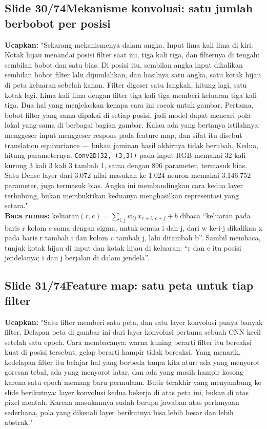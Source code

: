 \documentclass[11pt]{article}
\renewcommand{\framebox}[1]{\colorbox{acc!15}{\textcolor{acc}{\textbf{#1}}}}
\begin{document}
\subsection*{\framebox{Slide 30/74}\quad Mekanisme konvolusi: satu jumlah berbobot per posisi}
\textbf{Ucapkan:} "Sekarang mekanismenya dalam angka. Input lima kali lima di kiri. Kotak hijau menandai posisi filter saat ini, tiga kali tiga, dan filternya di tengah: sembilan bobot dan satu bias. Di posisi itu, sembilan angka input dikalikan sembilan bobot filter lalu dijumlahkan, dan hasilnya satu angka, satu kotak hijau di peta keluaran sebelah kanan. Filter digeser satu langkah, hitung lagi, satu kotak lagi. Lima kali lima dengan filter tiga kali tiga memberi keluaran tiga kali tiga. Dua hal yang menjelaskan kenapa cara ini cocok untuk gambar. Pertama, bobot filter yang sama dipakai di setiap posisi, jadi model dapat mencari pola lokal yang sama di berbagai bagian gambar. Kalau ada yang bertanya istilahnya: menggeser input menggeser respons pada feature map, dan sifat itu disebut translation equivariance --- bukan jaminan hasil akhirnya tidak berubah. Kedua, hitung parameternya. \texttt{Conv2D(32, (3,3))} pada input RGB memakai 32 kali kurung 3 kali 3 kali 3 tambah 1, sama dengan 896 parameter, termasuk bias. Satu Dense layer dari 3.072 nilai masukan ke 1.024 neuron memakai 3.146.752 parameter, juga termasuk bias. Angka ini membandingkan cara kedua layer terhubung, bukan membuktikan keduanya menghasilkan representasi yang setara."\\[2pt]
\textbf{Baca rumus:} $\text{keluaran}(r,c) = \sum_{i,j} w_{ij}\,x_{r+i,\,c+j} + b$ dibaca ``keluaran pada baris r kolom c sama dengan sigma, untuk semua i dan j, dari w ke-i-j dikalikan x pada baris r tambah i dan kolom c tambah j, lalu ditambah b''. Sambil membaca, tunjuk kotak hijau di input dan kotak hijau di keluaran: ``r dan c itu posisi jendelanya; i dan j berjalan di dalam jendela''.\\[2pt]

\subsection*{\framebox{Slide 31/74}\quad Feature map: satu peta untuk tiap filter}
\textbf{Ucapkan:} "Satu filter memberi satu peta, dan satu layer konvolusi punya banyak filter. Delapan peta di gambar ini dari layer konvolusi pertama sebuah CNN kecil setelah satu epoch. Cara membacanya: warna kuning berarti filter itu bereaksi kuat di posisi tersebut, gelap berarti hampir tidak bereaksi. Yang menarik, kedelapan filter itu belajar hal yang berbeda tanpa kita atur: ada yang menyorot goresan tebal, ada yang menyorot latar, dan ada yang masih hampir kosong karena satu epoch memang baru permulaan. Butir terakhir yang menyambung ke slide berikutnya: layer konvolusi kedua bekerja di atas peta ini, bukan di atas pixel mentah. Karena masukannya sudah berupa jawaban atas pertanyaan sederhana, pola yang dikenali layer berikutnya bisa lebih besar dan lebih abstrak."\\[2pt]
\end{document}
